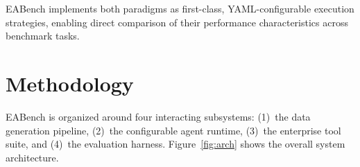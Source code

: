 \documentclass[10pt,twocolumn]{article}
\begin{document}
EABench implements both paradigms as first-class, YAML-configurable execution
strategies, enabling direct comparison of their performance characteristics
across benchmark tasks.

\section{Methodology}
\label{sec:method}

EABench is organized around four interacting subsystems:
(1)~the data generation pipeline,
(2)~the configurable agent runtime,
(3)~the enterprise tool suite, and
(4)~the evaluation harness.
Figure~\ref{fig:arch} shows the overall system architecture.
\end{document}
